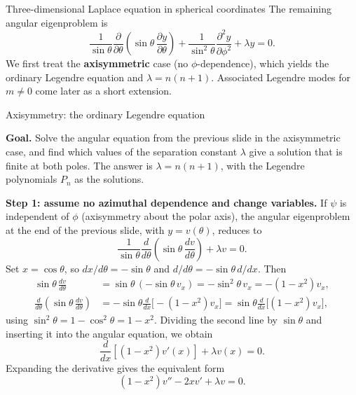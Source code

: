 \documentclass[11pt]{beamer}
\begin{document}
\begin{frame}[allowframebreaks=1.00]{Three-dimensional Laplace equation in spherical coordinates}
The remaining angular eigenproblem is
\[
  \frac{1}{\sin\theta}
    \frac{\partial}{\partial\theta}
      \left(\sin\theta\,\frac{\partial y}{\partial\theta}\right)
  +\frac{1}{\sin^2\theta}\frac{\partial^2y}{\partial\phi^2}
  +\lambda y=0.
\]
We first treat the \textbf{axisymmetric} case (no $\phi$-dependence), which yields the
ordinary Legendre equation and $\lambda=n(n+1)$.  Associated Legendre modes for
$m\neq0$ come later as a short extension.
\end{frame}

\begin{frame}[allowframebreaks=1.00]{Axisymmetry: the ordinary Legendre equation}
\footnotesize

\textbf{Goal.} Solve the angular equation from the previous slide in the axisymmetric case, and
find which values of the separation constant $\lambda$ give a solution that is finite at both
poles. The answer is $\lambda=n(n+1)$, with the Legendre polynomials $P_n$ as the solutions.

\textbf{Step 1: assume no azimuthal dependence and change variables.}  If $\psi$ is independent of $\phi$
(axisymmetry about the polar axis), the angular eigenproblem at the end of the previous slide, with $y=v(\theta)$, reduces to
\[
  \frac{1}{\sin\theta}
    \frac{d}{d\theta}
      \left(\sin\theta\,\frac{dv}{d\theta}\right)
  +\lambda v=0.
\]
Set $x=\cos\theta$, so $dx/d\theta=-\sin\theta$ and $d/d\theta=-\sin\theta\,d/dx$.
Then
\begin{align*}
  \sin\theta\,\frac{dv}{d\theta}
    &=\sin\theta\,(-\sin\theta\,v_x)=-\sin^2\theta\,v_x=-(1-x^2)v_x,\\
  \frac{d}{d\theta}\left(\sin\theta\,\frac{dv}{d\theta}\right)
    &=-\sin\theta\frac{d}{dx}\bigl[-(1-x^2)v_x\bigr]
     =\sin\theta\frac{d}{dx}\bigl[(1-x^2)v_x\bigr],
\end{align*}
using $\sin^2\theta=1-\cos^2\theta=1-x^2$. Dividing the second line by $\sin\theta$ and
inserting it into the angular equation, we obtain
\begin{equation}
  \frac{d}{dx}\left[(1-x^2)v'(x)\right]+\lambda v(x)=0.
  \label{eq:legendre-eq-lambda}
\end{equation}
Expanding the derivative gives the equivalent form
\begin{equation}
  (1-x^2)v''-2xv'+\lambda v=0.
  \label{eq:legendre-eq-expanded-lambda}
\end{equation}


\end{frame}
\end{document}
